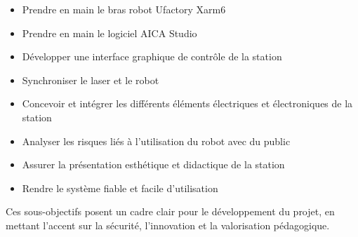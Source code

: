 \begin{itemize}
    \item Prendre en main le bras robot Ufactory Xarm6
    \item Prendre en main le logiciel AICA Studio
    \item Développer une interface graphique de contrôle de la station
    \item Synchroniser le laser et le robot
    \item Concevoir et intégrer les différents éléments électriques et électroniques de la station
    \item Analyser les risques liés à l'utilisation du robot avec du public
    \item Assurer la présentation esthétique et didactique de la station
    \item Rendre le système fiable et facile d'utilisation
\end{itemize}

Ces sous-objectifs posent un cadre clair pour le développement du projet, en mettant l'accent sur la sécurité, l'innovation et la valorisation pédagogique.


